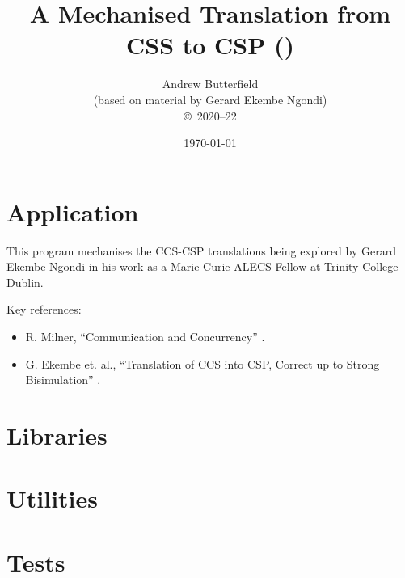 \documentclass[fleqn,10pt]{report}
\author{
Andrew Butterfield
\\(based on material by Gerard Ekembe Ngondi)
\\
{\small \copyright\ 2020--22}
}
\title{
  A Mechanised Translation from CSS to CSP
  (\VERSION)
}
\date{
\today
}
\begin{document}
\maketitle
\setcounter{tocdepth}{4}
\tableofcontents


\chapter{Application}

This program mechanises the CCS-CSP translations
being explored by Gerard Ekembe Ngondi
in his work as a Marie-Curie ALECS Fellow at Trinity College Dublin.

Key references:
\begin{itemize}
  \item R. Milner, ``Communication and Concurrency''
  \cite{Comm:Concur:Milner:89}.
  \item G. Ekembe et. al., ``Translation of CCS into CSP, Correct up to
Strong Bisimulation'' \cite{DBLP:conf/sefm/NgondiKB21}.
\end{itemize}

\newpage

\chapter{Libraries}

\newpage
\newpage
\newpage

\appendix

\chapter{Utilities}

\newpage


\chapter{Tests}

\newpage

% 



\end{document}
